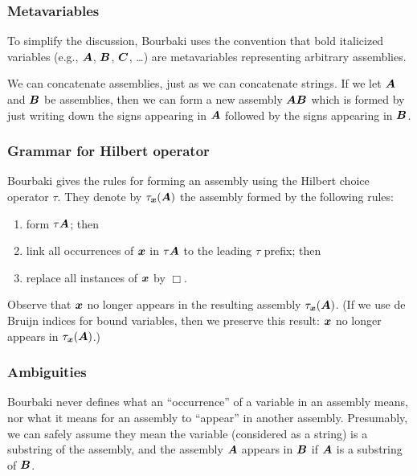 \subsubsection{Metavariables}
To simplify the discussion, Bourbaki uses the convention that bold
italicized variables (e.g., $\boldsymbol{A}$, $\boldsymbol{B}$,
$\boldsymbol{C}$, \dots) are metavariables representing arbitrary
assemblies.

\begin{example}
We can concatenate assemblies, just as we can concatenate strings.
If we let $\boldsymbol{A}$ and $\boldsymbol{B}$ be assemblies,
then we can form a new assembly $\boldsymbol{A}\boldsymbol{B}$
which is formed by just writing down the signs appearing in
$\boldsymbol{A}$ followed by the signs appearing in $\boldsymbol{B}$.
\end{example}

\subsubsection{Grammar for Hilbert operator}
Bourbaki gives the rules for forming an assembly using the Hilbert
choice operator $\tau$. They denote by $\tau_{\boldsymbol{x}}(\boldsymbol{A})$
the assembly formed by the following rules:
\begin{enumerate}
\item form $\tau\boldsymbol{A}$; then
\item link all occurrences of $\boldsymbol{x}$ in $\tau\boldsymbol{A}$
  to the leading $\tau$ prefix; then
\item replace all instances of $\boldsymbol{x}$ by $\Box$.
\end{enumerate}
Observe that $\boldsymbol{x}$ no longer appears in the resulting
assembly $\tau_{\boldsymbol{x}}(\boldsymbol{A})$. (If we use de
Bruijn indices for bound variables, then we preserve this result:
$\boldsymbol{x}$ no longer appears in $\tau_{\boldsymbol{x}}(\boldsymbol{A})$.)

\subsubsection{Ambiguities}\label{sec:1-1:ambiguity}
Bourbaki never defines what an ``occurrence'' of a variable in an
assembly means, nor what it means for an assembly to ``appear'' in
another assembly. Presumably, we can safely assume they mean the
variable (considered as a string) is a substring of the assembly, and
the assembly $\boldsymbol{A}$ appears in $\boldsymbol{B}$ if
$\boldsymbol{A}$ is a substring of $\boldsymbol{B}$.

